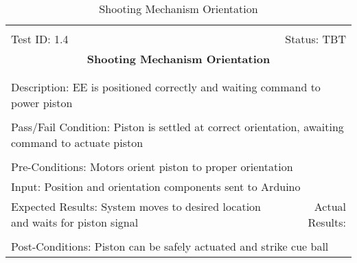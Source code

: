 \documentclass[titlepage]{article}
\begin{document}
\begin{center}%
\begin{table}[h!]
\begin{tabular}{|l r|}\hline&\\[-2mm]
	Test ID: 1.4	&Status: TBT\\[-3mm]
	\multicolumn{2}{|c|}{\textbf{\large{Shooting Mechanism Orientation}}}\\&\\\hline&\\[-3mm]
	\multicolumn{2}{|p{\textwidth}|}{Description: EE is positioned correctly and waiting command to power piston}\\[1mm]\hline&\\[-3mm]
	\multicolumn{2}{|p{\textwidth}|}{Pass/Fail Condition: Piston is settled at correct orientation, awaiting command to actuate piston}\\[1mm]\hline&\\[-3mm]
	\multicolumn{2}{|p{\textwidth}|}{Pre-Conditions: Motors orient piston to proper orientation}\\[4mm]
	\multicolumn{2}{|p{\textwidth}|}{Input: Position and orientation components sent to Arduino}\\[2mm]\hline
	\multicolumn{1}{|p{0.49\textwidth}}{Expected Results: System moves to desired location and waits for piston signal}	&\multicolumn{1}{|p{0.45\textwidth}|}{Actual Results:}\\\hline&\\[-3mm]
	\multicolumn{2}{|p{\textwidth}|}{Post-Conditions: Piston can be safely actuated and strike cue ball}\\\hline
\end{tabular}
\caption{Shooting Mechanism Orientation}
\end{table}
\end{center}
\end{document}
